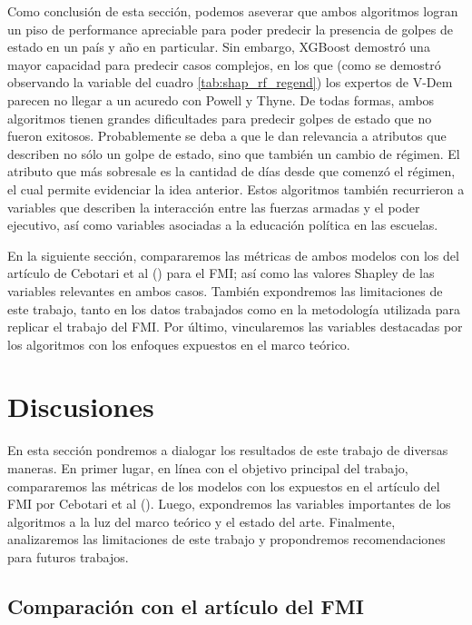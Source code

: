 \documentclass{article}
\begin{document}
Como conclusión de esta sección, podemos aseverar que ambos algoritmos logran un piso de performance 
apreciable para poder predecir la presencia de golpes de estado en un país y año en particular. Sin 
embargo, XGBoost demostró una mayor capacidad para predecir casos complejos, en los que (como se 
demostró observando la variable del cuadro \ref{tab:shap_rf_regend}) los expertos de V-Dem parecen no 
llegar a un acuredo con Powell y Thyne. De todas formas, ambos algoritmos tienen grandes dificultades 
para predecir golpes 
de estado que no fueron exitosos. Probablemente se deba a que le dan relevancia a atributos que 
describen no sólo un golpe de estado, sino que también un cambio de régimen. El atributo que más 
sobresale es la cantidad de días desde que comenzó el régimen, el cual permite evidenciar la idea 
anterior. Estos algoritmos también recurrieron a variables que describen la interacción entre las 
fuerzas armadas y el poder ejecutivo, así como variables asociadas a la educación política en las 
escuelas.

En la siguiente sección, compararemos las métricas de ambos modelos con los del artículo
de Cebotari et al (\citeyear{Ceb24}) para el FMI; así como las valores Shapley de las variables 
relevantes en ambos casos. También expondremos las limitaciones de este trabajo, tanto en los
datos trabajados como en la metodología utilizada para replicar el trabajo del FMI. Por último,
vincularemos las variables destacadas por los algoritmos con los enfoques expuestos en el marco
teórico.

\section{Discusiones}

En esta sección pondremos a dialogar los resultados de este trabajo de diversas maneras. En primer
lugar, en línea con el objetivo principal del trabajo, compararemos las métricas de los modelos
con los expuestos en el artículo del FMI por Cebotari et al (\citeyear{Ceb24}). Luego, expondremos
las variables importantes de los algoritmos a la luz del marco teórico y el estado del arte. Finalmente,
analizaremos las limitaciones de este trabajo y propondremos recomendaciones para futuros trabajos.


\subsection{Comparación con el artículo del FMI}
\end{document}
